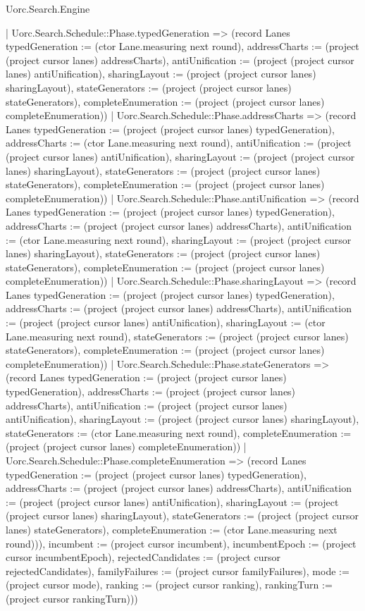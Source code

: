 \begin{lexlean}{Uorc.Search.Engine}
\begin{semanticmodule}
{{        | Uorc.Search.Schedule::Phase.typedGeneration => (record Lanes {typedGeneration := (ctor Lane.measuring next round), addressCharts := (project (project cursor lanes) addressCharts), antiUnification := (project (project cursor lanes) antiUnification), sharingLayout := (project (project cursor lanes) sharingLayout), stateGenerators := (project (project cursor lanes) stateGenerators), completeEnumeration := (project (project cursor lanes) completeEnumeration)})
        | Uorc.Search.Schedule::Phase.addressCharts => (record Lanes {typedGeneration := (project (project cursor lanes) typedGeneration), addressCharts := (ctor Lane.measuring next round), antiUnification := (project (project cursor lanes) antiUnification), sharingLayout := (project (project cursor lanes) sharingLayout), stateGenerators := (project (project cursor lanes) stateGenerators), completeEnumeration := (project (project cursor lanes) completeEnumeration)})
        | Uorc.Search.Schedule::Phase.antiUnification => (record Lanes {typedGeneration := (project (project cursor lanes) typedGeneration), addressCharts := (project (project cursor lanes) addressCharts), antiUnification := (ctor Lane.measuring next round), sharingLayout := (project (project cursor lanes) sharingLayout), stateGenerators := (project (project cursor lanes) stateGenerators), completeEnumeration := (project (project cursor lanes) completeEnumeration)})
        | Uorc.Search.Schedule::Phase.sharingLayout => (record Lanes {typedGeneration := (project (project cursor lanes) typedGeneration), addressCharts := (project (project cursor lanes) addressCharts), antiUnification := (project (project cursor lanes) antiUnification), sharingLayout := (ctor Lane.measuring next round), stateGenerators := (project (project cursor lanes) stateGenerators), completeEnumeration := (project (project cursor lanes) completeEnumeration)})
        | Uorc.Search.Schedule::Phase.stateGenerators => (record Lanes {typedGeneration := (project (project cursor lanes) typedGeneration), addressCharts := (project (project cursor lanes) addressCharts), antiUnification := (project (project cursor lanes) antiUnification), sharingLayout := (project (project cursor lanes) sharingLayout), stateGenerators := (ctor Lane.measuring next round), completeEnumeration := (project (project cursor lanes) completeEnumeration)})
        | Uorc.Search.Schedule::Phase.completeEnumeration => (record Lanes {typedGeneration := (project (project cursor lanes) typedGeneration), addressCharts := (project (project cursor lanes) addressCharts), antiUnification := (project (project cursor lanes) antiUnification), sharingLayout := (project (project cursor lanes) sharingLayout), stateGenerators := (project (project cursor lanes) stateGenerators), completeEnumeration := (ctor Lane.measuring next round)})), incumbent := (project cursor incumbent), incumbentEpoch := (project cursor incumbentEpoch), rejectedCandidates := (project cursor rejectedCandidates), familyFailures := (project cursor familyFailures), mode := (project cursor mode), ranking := (project cursor ranking), rankingTurn := (project cursor rankingTurn)}))
}
\end{semanticmodule}
\end{lexlean}
